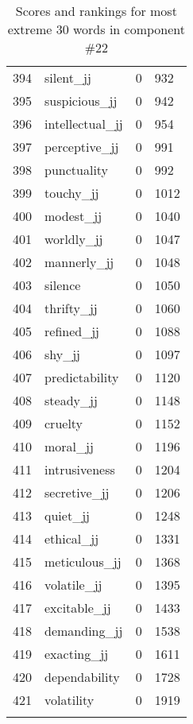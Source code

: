 \begin{longtable}[!htbp]{| rlr@{.}l |}
    394 & silent\_jj & 0 & 932 \\
    395 & suspicious\_jj & 0 & 942 \\
    396 & intellectual\_jj & 0 & 954 \\
    397 & perceptive\_jj & 0 & 991 \\
    398 & punctuality & 0 & 992 \\
    399 & touchy\_jj & 0 & 1012 \\
    400 & modest\_jj & 0 & 1040 \\
    401 & worldly\_jj & 0 & 1047 \\
    402 & mannerly\_jj & 0 & 1048 \\
    403 & silence & 0 & 1050 \\
    404 & thrifty\_jj & 0 & 1060 \\
    405 & refined\_jj & 0 & 1088 \\
    406 & shy\_jj & 0 & 1097 \\
    407 & predictability & 0 & 1120 \\
    408 & steady\_jj & 0 & 1148 \\
    409 & cruelty & 0 & 1152 \\
    410 & moral\_jj & 0 & 1196 \\
    411 & intrusiveness & 0 & 1204 \\
    412 & secretive\_jj & 0 & 1206 \\
    413 & quiet\_jj & 0 & 1248 \\
    414 & ethical\_jj & 0 & 1331 \\
    415 & meticulous\_jj & 0 & 1368 \\
    416 & volatile\_jj & 0 & 1395 \\
    417 & excitable\_jj & 0 & 1433 \\
    418 & demanding\_jj & 0 & 1538 \\
    419 & exacting\_jj & 0 & 1611 \\
    420 & dependability & 0 & 1728 \\
    421 & volatility & 0 & 1919 \\
    \hline
    \caption{Scores and rankings for most extreme 30 words in component \#22} \\
\end{longtable}
